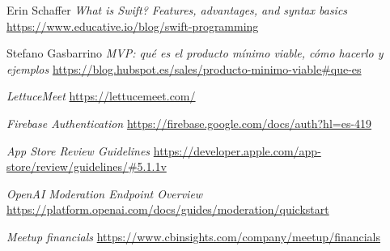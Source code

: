 
\begin{thebibliography}{9}
    Erin Schaffer
    \textit{What is Swift? Features, advantages, and syntax basics}
    \url{https://www.educative.io/blog/swift-programming}

    Stefano Gasbarrino
    \textit{MVP: qué es el producto mínimo viable, cómo hacerlo y ejemplos}
    \url{https://blog.hubspot.es/sales/producto-minimo-viable#que-es}

    \textit{LettuceMeet}
    \url{https://lettucemeet.com/}

    \textit{Firebase Authentication}
    \url{https://firebase.google.com/docs/auth?hl=es-419}

    \textit{App Store Review Guidelines}
    \url{https://developer.apple.com/app-store/review/guidelines/#5.1.1v}

    \textit{OpenAI Moderation Endpoint Overview}
    \url{https://platform.openai.com/docs/guides/moderation/quickstart}

    \textit{Meetup financials}
    \url{https://www.cbinsights.com/company/meetup/financials}

\end{thebibliography}